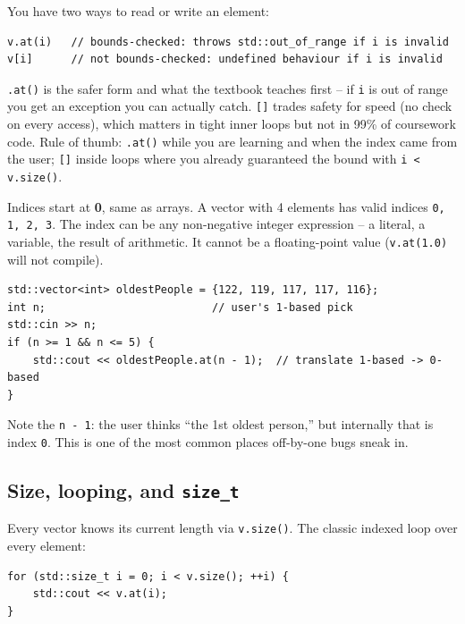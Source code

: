 \documentclass[11pt]{article}
\begin{document}
You have two ways to read or write an element:
\begin{lstlisting}
v.at(i)   // bounds-checked: throws std::out_of_range if i is invalid
v[i]      // not bounds-checked: undefined behaviour if i is invalid
\end{lstlisting}

\begin{warnbox}
\texttt{.at()} is the safer form and what the textbook teaches first -- if
\texttt{i} is out of range you get an exception you can actually catch.
\texttt{[]} trades safety for speed (no check on every access), which
matters in tight inner loops but not in 99\% of coursework code. Rule
of thumb: \texttt{.at()} while you are learning and when the index
came from the user; \texttt{[]} inside loops where you already
guaranteed the bound with \texttt{i < v.size()}.
\end{warnbox}

Indices start at \textbf{0}, same as arrays. A vector with 4 elements
has valid indices \texttt{0, 1, 2, 3}. The index can be any non-negative
integer expression -- a literal, a variable, the result of arithmetic.
It cannot be a floating-point value (\texttt{v.at(1.0)} will not
compile).

\begin{examplebox}
\begin{lstlisting}
std::vector<int> oldestPeople = {122, 119, 117, 117, 116};
int n;                          // user's 1-based pick
std::cin >> n;
if (n >= 1 && n <= 5) {
    std::cout << oldestPeople.at(n - 1);  // translate 1-based -> 0-based
}
\end{lstlisting}
Note the \texttt{n - 1}: the user thinks ``the 1st oldest person,''
but internally that is index \texttt{0}. This is one of the most common
places off-by-one bugs sneak in.
\end{examplebox}

\subsection{Size, looping, and \texttt{size\_t}}

Every vector knows its current length via \texttt{v.size()}. The classic
indexed loop over every element:
\begin{lstlisting}
for (std::size_t i = 0; i < v.size(); ++i) {
    std::cout << v.at(i);
}
\end{lstlisting}
\end{document}
